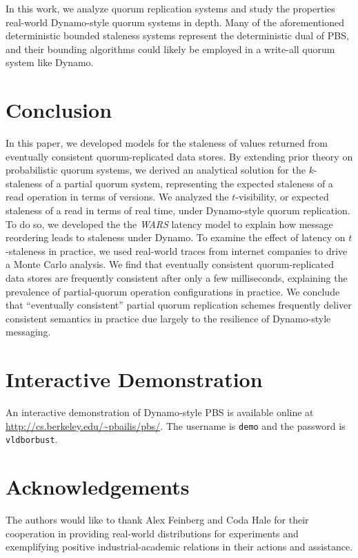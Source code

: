 \documentclass{vldb}
\begin{document}
In this work, we analyze quorum replication systems and study the
properties real-world Dynamo-style quorum systems in depth.  Many of
the aforementioned deterministic bounded staleness systems represent the
deterministic dual of PBS, and their bounding algorithms could likely
be employed in a write-all quorum system like Dynamo.


\section{Conclusion}
\label{sec:conclusion}

In this paper, we developed models for the staleness of values
returned from eventually consistent quorum-replicated data stores.  By
extending prior theory on probabilistic quorum systems, we derived an
analytical solution for the $k$-staleness of a partial quorum system,
representing the expected staleness of a read operation in terms of
versions.  We analyzed the $t$-visibility, or expected staleness of a
read in terms of real time, under Dynamo-style quorum replication.  To
do so, we developed the the \textit{WARS} latency model to explain how
message reordering leads to staleness under Dynamo.  To examine the
effect of latency on $t$-staleness in practice, we used real-world
traces from internet companies to drive a Monte Carlo analysis.  We
find that eventually consistent quorum-replicated data stores are
frequently consistent after only a few milliseconds, explaining the
prevalence of partial-quorum operation configurations in practice.  We
conclude that ``eventually consistent'' partial quorum replication
schemes frequently deliver consistent semantics in practice due largely to the
resilience of Dynamo-style messaging.

\section*{Interactive Demonstration}

An interactive demonstration of Dynamo-style PBS is available online at \url{http://cs.berkeley.edu/~pbailis/pbs/}.  The username is \texttt{demo} and the password is \texttt{vldborbust}.

\section*{Acknowledgements}

The authors would like to thank Alex Feinberg and Coda Hale for their
cooperation in providing real-world distributions for experiments and
exemplifying positive industrial-academic relations in their actions
and assistance.
\end{document}
